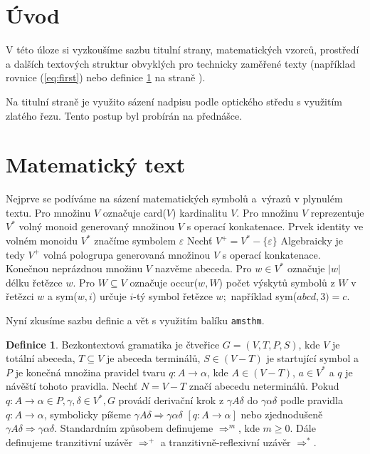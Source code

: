 \documentclass[11pt,a4paper, twocolumn]{article}
\author{Viktor Jančík}
\theoremstyle{definition}
\newtheorem{defn}{Definice}[section]
\theoremstyle{plain}
\begin{document}


\section*{Úvod}

V této úloze si vyzkoušíme sazbu titulní strany, matematických vzorců, prostředí a dalších textových struktur obvyklých pro technicky zaměřené texty (například rovnice (\ref{eq:first}) nebo definice \ref{def:oneone} na straně \pageref{def:oneone}).

Na titulní straně je využito sázení nadpisu podle optického středu s využitím zlatého řezu. Tento postup byl probírán na přednášce.

\section{Matematický text}

Nejprve se podíváme na sázení matematických symbolů a~výrazů v plynulém textu. Pro množinu $V$ označuje card($V$) kardinalitu $V$.
Pro množinu $V$ reprezentuje $V^*$ volný monoid generovaný množinou $V$ s operací konkatenace.
Prvek identity ve volném monoidu $V^*$ značíme symbolem $\varepsilon$
Nechť $V^+ = V^* - \{\varepsilon\}$ Algebraicky je tedy $V^+$ volná pologrupa generovaná množinou $V$ s operací konkatenace.
Konečnou neprázdnou množinu $V$ nazvěme abeceda.
Pro $w \in V^*$ označuje $|w|$ délku řetězce $w$. Pro $W \subseteq V$ označuje occur($w,W$) počet výskytů symbolů z $W$ v řetězci $w$ a sym($w,i$) určuje $i$-tý symbol řetězce $w;$ například sym($abcd,3) = c$.

Nyní zkusíme sazbu definic a vět s využitím balíku \verb|amsthm|.

\begin{defn}\label{def:oneone}Bezkontextová gramatika je čtveřice $G=(V,T,P,S)$, kde $V$ je totální abeceda,
$T \subseteq V$ je abeceda terminálů, $S\in(V-T)$ je startující symbol a $P$ je konečná množina pravidel
tvaru $q: A \rightarrow \alpha$, kde $A\in (V-T)$, $a\in V^*$ a $q$ je návěští tohoto pravidla. Nechť $N = V-T$ značí abecedu neterminálů.
Pokud $q: A \rightarrow \alpha \in P, \gamma, \delta \in V^*, G$ provádí derivační krok z $\gamma A \delta$ do $\gamma \alpha \delta$ podle pravidla $q: A \rightarrow \alpha$, symbolicky píšeme 
$\gamma A \delta \Rightarrow \gamma \alpha \delta$ $[q: A \rightarrow \alpha ]$ nebo zjednodušeně $\gamma A \delta \Rightarrow \gamma \alpha \delta$. Standardním způsobem definujeme $\Rightarrow ^m$, kde $m\geq 0$. Dále definujeme 
tranzitivní uzávěr $\Rightarrow ^+$ a tranzitivně-reflexivní uzávěr $\Rightarrow ^*$. \end{defn}
\end{document}
